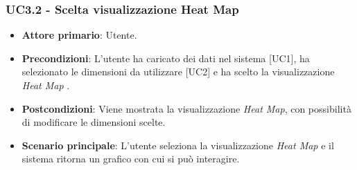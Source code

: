 \subsubsection{UC3.2 - Scelta visualizzazione Heat Map}
\begin{itemize}
	\item \textbf{Attore primario}: Utente.
	\item \textbf{Precondizioni}: L'utente ha caricato dei dati nel sistema [UC1], ha selezionato le dimensioni da utilizzare [UC2] e ha scelto la visualizzazione \textit{Heat Map} .
	\item \textbf{Postcondizioni}: Viene mostrata la visualizzazione \textit{Heat Map}, con possibilità di modificare le dimensioni scelte.
	\item \textbf{Scenario principale}: L'utente seleziona la visualizzazione \textit{Heat Map} e il sistema ritorna un grafico con cui si può interagire.

\end{itemize}